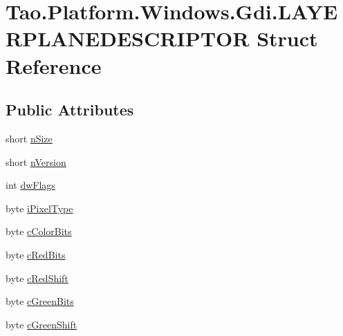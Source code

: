 \hypertarget{struct_tao_1_1_platform_1_1_windows_1_1_gdi_1_1_l_a_y_e_r_p_l_a_n_e_d_e_s_c_r_i_p_t_o_r}{
\section{Tao.Platform.Windows.Gdi.LAYERPLANEDESCRIPTOR Struct Reference}
\label{struct_tao_1_1_platform_1_1_windows_1_1_gdi_1_1_l_a_y_e_r_p_l_a_n_e_d_e_s_c_r_i_p_t_o_r}
}
\subsection*{Public Attributes}
\begin{DoxyCompactItemize}
\item 
short \hyperlink{struct_tao_1_1_platform_1_1_windows_1_1_gdi_1_1_l_a_y_e_r_p_l_a_n_e_d_e_s_c_r_i_p_t_o_r_aed2e94c17ecced9efa925a5c7759a8b3}{nSize}
\item 
short \hyperlink{struct_tao_1_1_platform_1_1_windows_1_1_gdi_1_1_l_a_y_e_r_p_l_a_n_e_d_e_s_c_r_i_p_t_o_r_a3cb5978ae5981853e75a3a64aa4a9187}{nVersion}
\item 
int \hyperlink{struct_tao_1_1_platform_1_1_windows_1_1_gdi_1_1_l_a_y_e_r_p_l_a_n_e_d_e_s_c_r_i_p_t_o_r_a3e8209bfdb702986734c858fab393a8f}{dwFlags}
\item 
byte \hyperlink{struct_tao_1_1_platform_1_1_windows_1_1_gdi_1_1_l_a_y_e_r_p_l_a_n_e_d_e_s_c_r_i_p_t_o_r_a1c90c78fee62a2cc518426d4a7f39e88}{iPixelType}
\item 
byte \hyperlink{struct_tao_1_1_platform_1_1_windows_1_1_gdi_1_1_l_a_y_e_r_p_l_a_n_e_d_e_s_c_r_i_p_t_o_r_a40614e2801fcf164aa7ea7cde0f52900}{cColorBits}
\item 
byte \hyperlink{struct_tao_1_1_platform_1_1_windows_1_1_gdi_1_1_l_a_y_e_r_p_l_a_n_e_d_e_s_c_r_i_p_t_o_r_a45a204ff4d4f1355bd75ff996bb8dd83}{cRedBits}
\item 
byte \hyperlink{struct_tao_1_1_platform_1_1_windows_1_1_gdi_1_1_l_a_y_e_r_p_l_a_n_e_d_e_s_c_r_i_p_t_o_r_a9c392390554dcb0afeb4b9c35b90fd32}{cRedShift}
\item 
byte \hyperlink{struct_tao_1_1_platform_1_1_windows_1_1_gdi_1_1_l_a_y_e_r_p_l_a_n_e_d_e_s_c_r_i_p_t_o_r_acd6ec96b9e307b8a1ab87040fae43d6b}{cGreenBits}
\item 
byte \hyperlink{struct_tao_1_1_platform_1_1_windows_1_1_gdi_1_1_l_a_y_e_r_p_l_a_n_e_d_e_s_c_r_i_p_t_o_r_aabf4e8c74273e4aede6a965b87de81ee}{cGreenShift}
\item 

\end{DoxyCompactItemize}

